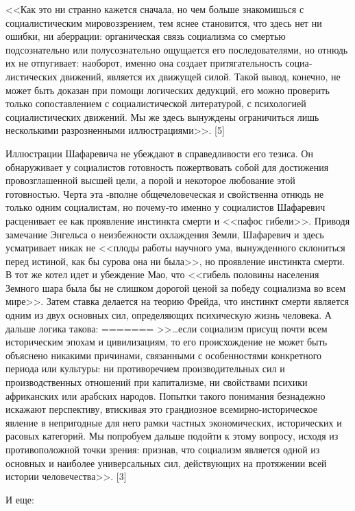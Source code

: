 \documentclass{book}
\begin{document}
<<Как это ни странно кажется сначала, но чем больше знако­мишься с социалистическим мировоззрением, тем яснее стано­вится, что здесь нет ни ошибки, ни аберрации: органическая связь социализма со смертью подсознательно или полусозна­тельно ощущается его последователями, но отнюдь их не отпу­гивает: наоборот, именно она создает притягательность социа­листических движений, является их движущей силой. Такой вывод, конечно, не может быть доказан при помощи логиче­ских дедукций, его можно проверить только сопоставлением с социалистической литературой, с психологией социалисти­ческих движений. Мы же здесь вынуждены ограничиться лишь несколькими разрозненными иллюстрациями>>. [5]

Иллюстрации Шафаревича не убеждают в справедливости его тезиса. Он обнаруживает у социалистов готовность пожертво­вать собой для достижения провозглашенной высшей цели, а порой и некоторое любование этой готовностью. Черта эта ‑вполне общечеловеческая и свойственна отнюдь не только од­ним социалистам, но почему‑то именно у социалистов Шафаревич расценивает ее как проявление инстинкта смерти и <<пафос гибели>>. Приводя замечание Энгельса о неизбежности охлажде­ния Земли, Шафаревич и здесь усматривает никак не <<плоды работы научного ума, вынужденного склониться перед истиной, как бы сурова она ни была>>, но проявление инстинкта смерти. В тот же котел идет и убеждение Мао, что <<гибель половины на­селения Земного шара была бы не слишком дорогой ценой за победу социализма во всем мире>>. Затем ставка делается на тео­рию Фрейда, что инстинкт смерти является одним из двух основ­ных сил, определяющих психическую жизнь человека. А даль­ше логика такова:
=======
>>\ldots если социализм присущ почти всем историческим эпохам и цивилизациям, то его происхождение не может быть объяс­нено никакими причинами, связанными с особенностями кон­кретного периода или культуры: ни противоречием производи­тельных сил и производственных отношений при капитализме, ни свойствами психики африканских или арабских народов. По­пытки такого понимания безнадежно искажают перспективу, втискивая это грандиозное всемирно-историческое явление в непригодные для него рамки частных экономических, истори­ческих и расовых категорий. Мы попробуем дальше подойти к этому вопросу, исходя из противоположной точки зрения: признав, что социализм является одной из основных и наибо­лее универсальных сил, действующих на протяжении всей исто­рии человечества>>. [3]

И еще:
\end{document}
